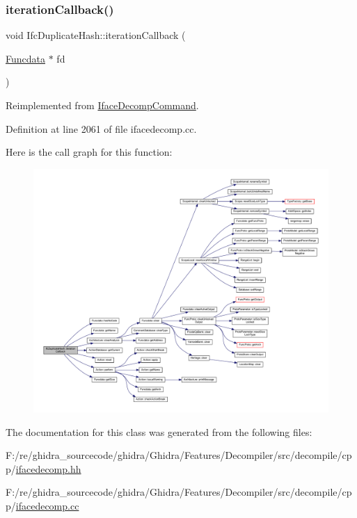 \subsubsection{\texorpdfstring{iterationCallback()}{iterationCallback()}}
{\footnotesize\ttfamily void Ifc\+Duplicate\+Hash\+::iteration\+Callback (\begin{DoxyParamCaption}\item[{\mbox{\hyperlink{class_funcdata}{Funcdata}} $\ast$}]{fd }\end{DoxyParamCaption})\hspace{0.3cm}{\ttfamily [virtual]}}



Reimplemented from \mbox{\hyperlink{class_iface_decomp_command_a619d9358a4e77bef66a26f02ea7a6c8e}{Iface\+Decomp\+Command}}.



Definition at line 2061 of file ifacedecomp.\+cc.

Here is the call graph for this function\+:
\nopagebreak
\begin{figure}[H]
\begin{center}
\leavevmode
\includegraphics[width=350pt]{class_ifc_duplicate_hash_a5459747ed3d0b946f717556fd9e40c08_cgraph}
\end{center}
\end{figure}


The documentation for this class was generated from the following files\+:\begin{DoxyCompactItemize}
\item 
F\+:/re/ghidra\+\_\+sourcecode/ghidra/\+Ghidra/\+Features/\+Decompiler/src/decompile/cpp/\mbox{\hyperlink{ifacedecomp_8hh}{ifacedecomp.\+hh}}\item 
F\+:/re/ghidra\+\_\+sourcecode/ghidra/\+Ghidra/\+Features/\+Decompiler/src/decompile/cpp/\mbox{\hyperlink{ifacedecomp_8cc}{ifacedecomp.\+cc}}\end{DoxyCompactItemize}

